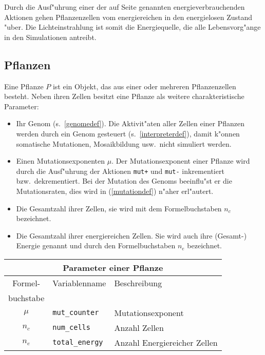 Durch die Ausf"uhrung einer der auf Seite \pageref{cellactionlist} genannten
energieverbrauchenden Aktionen gehen Pflanzenzellen vom energiereichen
in den energielosen Zustand "uber. Die Lichteinstrahlung ist somit die
Energiequelle, die alle Lebensvorg"ange in den Simulationen antreibt.


\subsection{Pflanzen}
\label{plantdef}

Eine Pflanze $P$ ist ein Objekt, das aus einer oder mehreren Pflanzenzellen besteht.
Neben ihren Zellen besitzt eine Pflanze als weitere charakteristische Parameter:

\begin{itemize}
\item Ihr Genom (s.\ \ref{genomedef}). Die Aktivit"aten aller Zellen einer Pflanzen
    werden durch ein Genom gesteuert (s.\ \ref{interpreterdef}), damit k"onnen
    somatische Mutationen, Mosaikbildung usw.\ nicht simuliert werden.
\item Einen Mutationsexponenten $\mu$. Der Mutationsexponent einer Pflanze wird durch
    die Ausf"uhrung der Aktionen \verb|mut+| und \verb|mut-| inkrementiert
    bzw.\ dekrementiert. Bei der Mutation des Genoms beeinflu"st er
    die Mutationsraten, dies wird in (\ref{mutationdef}) n"aher erl"autert.
\item Die Gesamtzahl ihrer Zellen, sie wird mit dem Formelbuchstaben $n_c$
    bezeichnet.
\item Die Gesamtzahl ihrer energiereichen Zellen. Sie wird auch ihre (Gesamt-) Energie
    genannt und durch den Formelbuchstaben $n_e$ bezeichnet.
\end{itemize}

\medskip
\noindent\begin{tabularx}{\linewidth}{|c|l|X|} \hline
\multicolumn{3}{|c|}{\bfseries Parameter einer Pflanze} \\ \hline
Formel- & Variablenname & Beschreibung \\
buchstabe &               & \\ \hline
$\mu$ & \verb|mut_counter| & Mutationsexponent \\
$n_c$ & \verb|num_cells| & Anzahl Zellen \\
$n_e$ & \verb|total_energy| & Anzahl Energiereicher Zellen \\ \hline
\end{tabularx}
\medskip


